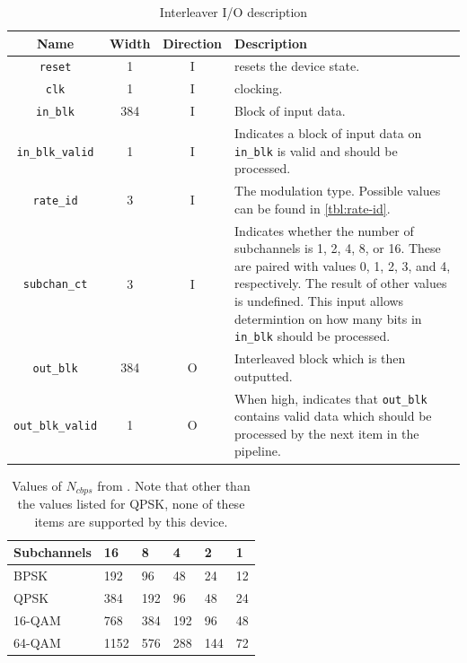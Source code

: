 \documentclass[dvips,10pt,twocolumn]{article}
\newcommand{\wire}{\texttt}
\begin{document}
\begin{table} \begin{tabularx}{\linewidth}{c|c|c|X}
	\label{tbl:interleaver-io}
	Name & Width & Direction & Description \\ \hline

	\wire{reset} & 1 & I & resets the device state. \\

	\wire{clk}   & 1 & I & clocking. \\

	\wire{in\_blk} & 384 & I & Block of input data. \\

	\wire{in\_blk\_valid} & 1 & I & Indicates a block of input data on
	\wire{in\_blk} is valid and should be processed. \\

	\wire{rate\_id} & 3 & I & The modulation type. Possible values can be
	found in \autoref{tbl:rate-id}. \\

	\wire{subchan\_ct} & 3 & I & Indicates whether the number of subchannels
	is 1, 2, 4, 8, or 16. These are paired with values 0, 1, 2, 3, and 4,
	respectively. The result of other values is undefined. This input
	allows determintion on how many bits in \wire{in\_blk} should be
	processed. \\

	\wire{out\_blk} & 384 & O & Interleaved block which is then outputted.
	\\

	\wire{out\_blk\_valid} & 1 & O & When high, indicates that
	\wire{out\_blk} contains valid data which should be processed by the
	next item in the pipeline. 
\end{tabularx} \caption{Interleaver I/O description} \end{table}


\begin{table} \begin{tabularx}{\linewidth}{X|X|X|X|X|X}
	\label{tbl:Ncbps}
	Subchannels & 16 & 8 & 4 & 2 & 1 \\ \hline
	
	BPSK   & 192  & 96  & 48  & 24  & 12 \\
	QPSK   & 384  & 192 & 96  & 48  & 24 \\
	16-QAM & 768  & 384 & 192 & 96  & 48 \\
	64-QAM & 1152 & 576 & 288 & 144 & 72
\end{tabularx} \caption{Values of $N_{cbps}$ from \cite{IEEE:802.16}. Note
that other than the values listed for QPSK, none of these items are
supported by this device.} \end{table}
\end{document}
